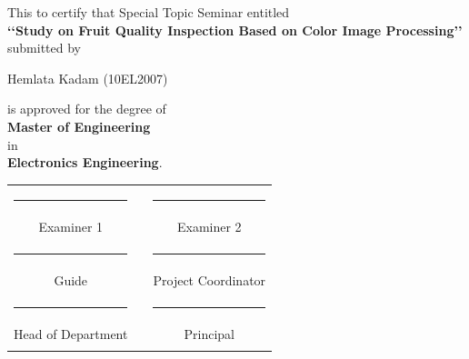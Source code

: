 \begin{center}
\large This to certify that Special Topic Seminar entitled\\
\textbf{\lq\lq Study on Fruit Quality Inspection Based on Color Image Processing\rq\rq} \\submitted by
\begin{center}
Hemlata Kadam (10EL2007)  \\
\end{center}
is approved for the degree of \\ \textbf {Master of Engineering}\\ in\\ \textbf {Electronics Engineering}.\\

\vspace{1in}
\begin{tabular}{ccc}
      \rule{5cm}{1sp}                &\rule{10mm}{0pt}& \rule{5cm}{1sp}
      \\\vspace{0.5in}
      Examiner 1                 && Examiner 2 \\
      \rule{5cm}{1sp}                && \rule{5cm}{1sp} \\ \vspace{0.5in}
       Guide             && Project Coordinator \\
      \rule{5cm}{1sp}                && \rule{5cm}{1sp} \\
      Head of Department                && Principal \\\\
    \end{tabular}
\end{center}
\cleardoublepage


